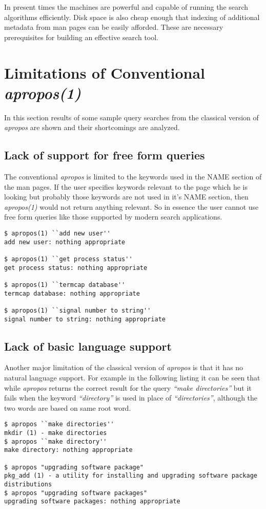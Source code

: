 \documentclass[titlepage, a4paper, 12pt]{article}
\begin{document}
In present times the machines are powerful and  capable of running the search
algorithms efficiently. Disk
space is also cheap enough that indexing of additional metadata from man pages
can be easily afforded. These are necessary prerequisites for building an
effective search tool.

\section{Limitations of Conventional \textit{apropos(1)}}
In this section results of some sample query searches from
the classical version of \textit{apropos} are shown and their shortcomings are
analyzed.

\subsection{Lack of support for free form queries}
The conventional \textit{apropos} is limited to the keywords used in the NAME
section
of the man pages. If the user specifies keywords relevant to the page which he
is looking but probably those keywords are not used in it's NAME section,
then \textit{apropos(1)} would not return
anything relevant. So in essence the user cannot use free form queries like
those supported by modern search applications.
\begin{lstlisting}
$ apropos(1) ``add new user''
add new user: nothing appropriate

$ apropos(1) ``get process status''
get process status: nothing appropriate

$ apropos(1) ``termcap database''
termcap database: nothing appropriate

$ apropos(1) ``signal number to string''
signal number to string: nothing appropriate
\end{lstlisting}

\subsection{Lack of basic language support}
Another major limitation of the classical version of \textit{apropos} is that
it has no
natural language support. For example in the following listing it can be seen
that while \textit{apropos} returns the correct result for the query \textit{``make directories''} but it fails when the keyword \textit{``directory''} is
used in place of \textit{``directories''}, although the two words are based on
same root word.
\begin{lstlisting}
$ apropos ``make directories''
mkdir (1) - make directories
$ apropos ``make directory''
make directory: nothing appropriate

$ apropos "upgrading software package"
pkg_add (1) - a utility for installing and upgrading software package
distributions
$ apropos "upgrading software packages"
upgrading software packages: nothing appropriate
\end{lstlisting}
\end{document}
